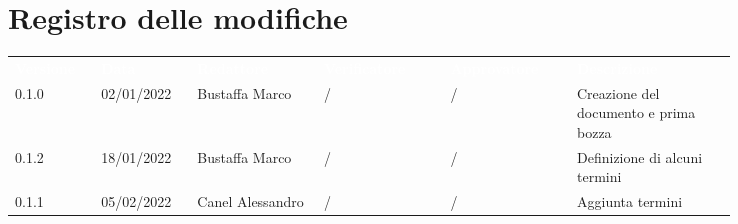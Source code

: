 \section*{Registro delle modifiche}

{\renewcommand{\arraystretch}{1.5}
\scriptsize
\begin{tabular}{p{0.10\linewidth}p{0.10\linewidth}p{0.15\linewidth}p{0.15\linewidth}p{0.15\linewidth}p{0.19\linewidth}}
	\rowcolor[RGB]{33, 73, 50}
	\textcolor{white}{\textbf{Versione}} & \textcolor{white}{\textbf{Data}} &
	\textcolor{white}{\textbf{Redattore}} & \textcolor{white}{\textbf{Verificatore}} &
	\textcolor{white}{\textbf{Approvatore}} & \textcolor{white}{\textbf{Descrizione}}\\
	\rowcolor[RGB]{216, 235, 171}
	0.1.0 & 02/01/2022 & Bustaffa Marco & / &/& Creazione del documento e prima bozza\\
	\rowcolor[RGB]{233, 245, 206}
	0.1.2 & 18/01/2022 & Bustaffa Marco & / &/& Definizione di alcuni termini\\
	\rowcolor[RGB]{216, 235, 171}
	0.1.1 & 05/02/2022 & Canel Alessandro & / &/& Aggiunta termini\\
\end{tabular}
}
